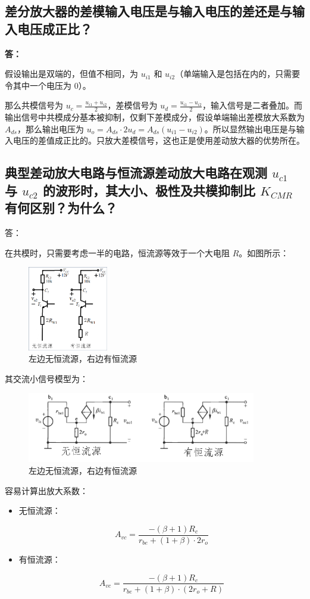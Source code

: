 \documentclass[a4paper,11pt,UTF8]{ctexart}
\newcommand{\p}{\par}
\newcommand{\np}{\par\noindent}
\begin{document}
\subsection{差分放大器的差模输入电压是与输入电压的差还是与输入电压成正比？}
\np \textbf{答：}
\p 假设输出是双端的，但值不相同，为 $u_{i1}$ 和 $u_{i2}$（单端输入是包括在内的，只需要令其中一个电压为 0）。
\p 那么共模信号为 $u_c=\frac{u_{i1}+u_{i2}}{2}$，差模信号为 $u_d=\frac{u_{i1}-u_{i2}}{2}$，输入信号是二者叠加。而输出信号中共模成分基本被抑制，仅剩下差模成分，假设单端输出差模放大系数为 $A_{ds}$，那么输出电压为 $u_o=A_{ds}\cdot 2u_d=A_{ds}(u_{i1}-u_{i2})$。所以显然输出电压是与输入电压的差值成正比的。只放大差模信号，这也正是使用差动放大器的优势所在。


\subsection{典型差动放大电路与恒流源差动放大电路在观测 $u_{c1}$ 与 $u_{c2}$ 的波形时，其大小、极性及共模抑制比 $K_{CMR}$ 有何区别？为什么？}
\np 答：
\p 在共模时，只需要考虑一半的电路，恒流源等效于一个大电阻 $R$。如图所示：
\begin{figure}[H]
 \centering
 \includegraphics[width=3.5cm]{CCircuit}
 \caption{左边无恒流源，右边有恒流源}
 \label{fig:add-3}
\end{figure}
\p 其交流小信号模型为：
\begin{figure}[H]
 \centering
 \includegraphics[width=10cm]{CCircuitSmallSignal}
 \caption{左边无恒流源，右边有恒流源}
 \label{fig:add-3-ss}
\end{figure}
\p 容易计算出放大系数：
\begin{itemize}
 \item 无恒流源：
 \np 
 \[ A_{vc}=\frac{-(\beta+1)R_c}{r_{be}+(1+\beta)\cdot 2r_o} \]
 \item 有恒流源：
 \np
 \[ A_{vc}=\frac{-(\beta+1)R_c}{r_{be}+(1+\beta)\cdot(2r_o+R)} \]
\end{itemize}
\end{document}
